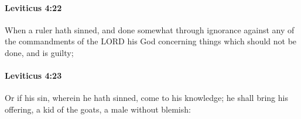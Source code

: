 		\paragraph{Leviticus 4:22} %
			\label{LEVITICUS-4-22}

			When a ruler hath sinned, and done somewhat through ignorance against any of the commandments of the LORD his God concerning things which should not be done, and is guilty;


		\paragraph{Leviticus 4:23} %
			\label{LEVITICUS-4-23}

			Or if his sin, wherein he hath sinned, come to his knowledge; he shall bring his offering, a kid of the goats, a male without blemish:


